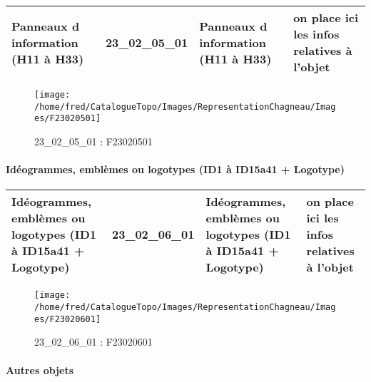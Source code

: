 \documentclass[12pt,titlepage,oneside]{book}
\begin{document}
\renewcommand{\arraystretch}{1.2}
\begin{supertabular}{|p{10cm}|c|p{13cm}|p{12cm}|}
 Panneaux d information (H11 à H33) & 23\_02\_05\_01 & Panneaux d information (H11 à H33) & on place ici les infos relatives à l'objet\\
\hline
\end{supertabular}
\begin{figure}[h!]
  \hfill         %
  \begin{minipage}[t]{3cm}
    \begin{center}
      \texttt{[image: /home/fred/CatalogueTopo/Images/RepresentationChagneau/Images/F23020501]}
      \caption[F23020501]{\label{} 23\_02\_05\_01 : F23020501}
    \end{center}
  \end{minipage}
\end{figure}


\paragraph{Idéogrammes, emblèmes ou logotypes (ID1 à ID15a41 + Logotype)}
\noindent
\vspace{\baselineskip}

\renewcommand{\arraystretch}{1.2}
\begin{supertabular}{|p{10cm}|c|p{13cm}|p{12cm}|}
 Idéogrammes, emblèmes ou logotypes (ID1 à ID15a41 + Logotype) & 23\_02\_06\_01 & Idéogrammes, emblèmes ou logotypes (ID1 à ID15a41 + Logotype) & on place ici les infos relatives à l'objet\\
\hline
\end{supertabular}
\begin{figure}[h!]
  \hfill         %
  \begin{minipage}[t]{3cm}
    \begin{center}
      \texttt{[image: /home/fred/CatalogueTopo/Images/RepresentationChagneau/Images/F23020601]}
      \caption[F23020601]{\label{} 23\_02\_06\_01 : F23020601}
    \end{center}
  \end{minipage}
\end{figure}


\paragraph{Autres objets}
\noindent
\vspace{\baselineskip}
\end{document}
